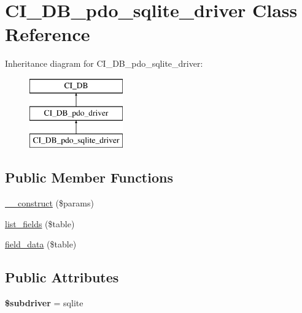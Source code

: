 \hypertarget{class_c_i___d_b__pdo__sqlite__driver}{}\section{C\+I\+\_\+\+D\+B\+\_\+pdo\+\_\+sqlite\+\_\+driver Class Reference}
\label{class_c_i___d_b__pdo__sqlite__driver}
Inheritance diagram for C\+I\+\_\+\+D\+B\+\_\+pdo\+\_\+sqlite\+\_\+driver\+:\begin{figure}[H]
\begin{center}
\leavevmode
\includegraphics[height=3.000000cm]{class_c_i___d_b__pdo__sqlite__driver}
\end{center}
\end{figure}
\subsection*{Public Member Functions}
\begin{DoxyCompactItemize}
\item 
\mbox{\hyperlink{class_c_i___d_b__pdo__sqlite__driver_a254cd46bb6292de58347ae2d36dd69d5}{\+\_\+\+\_\+construct}} (\$params)
\item 
\mbox{\hyperlink{class_c_i___d_b__pdo__sqlite__driver_a59db8812b869c0806cab617a706f0397}{list\+\_\+fields}} (\$table)
\item 
\mbox{\hyperlink{class_c_i___d_b__pdo__sqlite__driver_a2a13916cb4ab3e46199526b06a2b48a9}{field\+\_\+data}} (\$table)
\end{DoxyCompactItemize}
\subsection*{Public Attributes}
\begin{DoxyCompactItemize}
\item 
\mbox{\label{class_c_i___d_b__pdo__sqlite__driver_a0a758a98c5056c675202ac739bb259e9}} 
{\bfseries \$subdriver} = \textquotesingle{}sqlite\textquotesingle{}
\end{DoxyCompactItemize}
